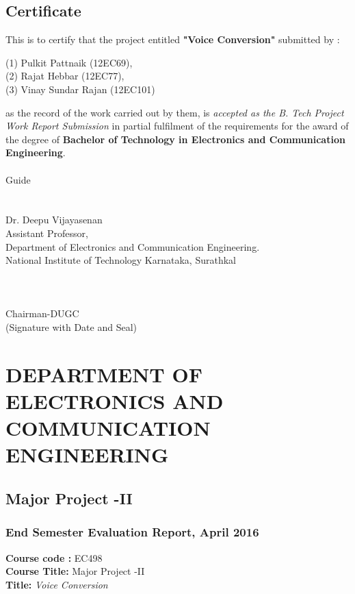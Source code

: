 \documentclass[BTech]{nitkdiss}
\begin{document}
\pagebreak
\begin{center}
\section*{Certificate}
\end{center}
This is to certify that the project entitled \textbf{"Voice Conversion"} submitted by : \\
\begin{center}
(1) Pulkit Pattnaik (12EC69),\\
(2) Rajat Hebbar (12EC77),\\
(3) Vinay Sundar Rajan (12EC101)
\end{center}
as the record of the work carried out by them, is \textit{accepted as the B. Tech Project Work Report Submission} in partial fulfilment of the requirements for the award of the degree of \textbf{Bachelor of Technology in Electronics and Communication Engineering}.\\ \\  
Guide
\\
\\
\\
Dr. Deepu Vijayasenan\\
Assistant Professor,\\
Department of Electronics and Communication Engineering.\\
National Institute of Technology Karnataka, Surathkal
\\
\\
\\
\\
Chairman-DUGC\\
(Signature with Date and Seal)
\newpage
\pagebreak
\section*{DEPARTMENT OF ELECTRONICS AND COMMUNICATION ENGINEERING}

\subsection*{Major Project -II}  
\subsubsection*{End Semester Evaluation Report, April 2016}

\textbf{Course  code :} EC498  \\
\textbf{Course Title:} Major Project -II \\
\textbf{Title:} \emph{Voice Conversion}
\end{document}
